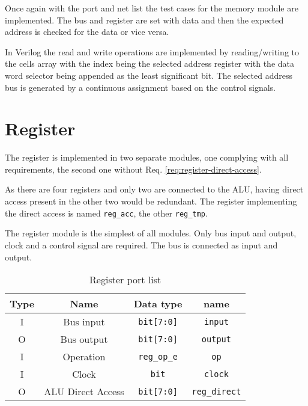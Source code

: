 Once again with the port and net list the test cases for the memory module are implemented. The bus and register are set with data and then the expected address is checked for the data or vice versa.

In Verilog the read and write operations are implemented by reading/writing to the cells array with the index being the selected address register with the data word selector being appended as the least significant bit. The selected address bus is generated by a continuous assignment based on the control signals. 

\section{Register}
The register is implemented in two separate modules, one complying with all requirements, the second one without Req. \ref{req:register-direct-access}. 

As there are four registers and only two are connected to the ALU, having direct access present in the other two would be redundant. The register implementing the direct access is named \texttt{reg\_acc}, the other \texttt{reg\_tmp}.

The register module is the simplest of all modules. Only bus input and output, clock and a control signal are required. The bus is connected as input and output.

\begin{table}[H]
  
  \begin{center}
  \begin{tabular}{cccc}
   Type & Name               & Data type                       & name                          \\ \hline
   I    & Bus input          & \texttt{bit{[}7:0{]}}          & \texttt{input}                \\
   O    & Bus output         & \texttt{bit{[}7:0{]}}          & \texttt{output}               \\
   I    & Operation          & \texttt{reg\_op\_e}         & \texttt{op}                   \\
   I    & Clock              & \texttt{bit}                   & \texttt{clock}               \\
   O    & ALU Direct Access               & \texttt{bit{[}7:0{]}}          & \texttt{reg\_direct}               \\
   \end{tabular}
  \end{center}
   \caption{Register port list}
   \label{tab:reg-io}
\end{table}


